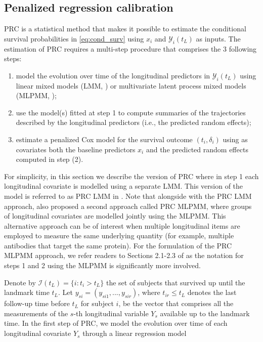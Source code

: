 \subsection{Penalized regression
calibration}\label{penalized-regression-calibration}

PRC \citep{signorelli2021} is a statistical method that makes it
possible to estimate the conditional survival probabilities in
\eqref{eq:cond_surv} using \(x_i\) and \(\mathcal{Y}_i(t_L)\) as inputs.
The estimation of PRC requires a multi-step procedure that comprises the
3 following steps:

\begin{enumerate}
\def\labelenumi{\arabic{enumi}.}
\tightlist
\item
  model the evolution over time of the longitudinal predictors in
  \(\mathcal{Y}_i(t_L)\) using linear mixed models (LMM,
  \citet{mcculloch2004}) or multivariate latent process mixed models
  (MLPMM, \citet{proust2013});
\item
  use the model(s) fitted at step 1 to compute summaries of the
  trajectories described by the longitudinal predictors (i.e., the
  predicted random effects);
\item
  estimate a penalized Cox model for the survival outcome
  \((t_i, \delta_i)\) using as covariates both the baseline predictors
  \(x_i\) and the predicted random effects computed in step (2).
\end{enumerate}

For simplicity, in this section we describe the version of PRC where in
step 1 each longitudinal covariate is modelled using a separate LMM.
This version of the model is referred to as PRC LMM in
\citet{signorelli2021}. Note that alongside with the PRC LMM approach,
\citet{signorelli2021} also proposed a second approach called PRC MLPMM,
where groups of longitudinal covariates are modelled jointly using the
MLPMM. This alternative approach can be of interest when multiple
longitudinal items are employed to measure the same underlying quantity
(for example, multiple antibodies that target the same protein). For the
formulation of the PRC MLPMM approach, we refer readers to Sections
2.1-2.3 of \citet{signorelli2021} as the notation for steps 1 and 2
using the MLPMM is significantly more involved.

Denote by \(\mathcal{I}(t_L) = \{ i: t_i > t_L \}\) the set of subjects
that survived up until the landmark time \(t_L\). Let
\(y_{si} = (y_{si1}, ..., y_{sir})\), where \(t_{ir} \leq t_L\) denotes
the last follow-up time before \(t_L\) for subject \(i\), be the vector
that comprises all the measurements of the \(s\)-th longitudinal
variable \(Y_s\) available up to the landmark time. In the first step of
PRC, we model the evolution over time of each longitudinal covariate
\(Y_s\) through a linear regression model

